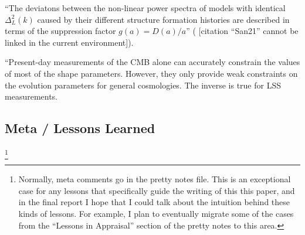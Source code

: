 \documentclass[11pt]{article}
\newcommand{\cbib}[1]
{\IfFileExists{biblatex.sty}
{\cite{#1}}
{[citation ``#1'' cannot be linked in the current environment]}}
\begin{document}
``The deviatons between the non-linear power spectra of models with identical
$\Delta_L^2 (k)$ caused by their different structure formation histories are
described in terms of the suppression factor $g(a) = D(a) / a$''
(\cbib{San21}).

``Present-day measurements of the CMB alone can accurately constrain the values
of most of the shape parameters. However, they only provide weak constraints on
the evolution parameters for general cosmologies. The inverse is true for LSS
measurements.

\begin{centering}
\section{Meta / Lessons Learned}
\end{centering}

\footnote{Normally, meta comments go in the pretty notes file. This is an
exceptional case for any lessons that specifically guide the writing of this
this paper, and in the final report I hope that I could talk about the
intuition behind these kinds of lessons. For example, I plan to eventually
migrate some of the cases from the ``Lessons in Appraisal'' section of the
pretty notes to this area.
}

 {
    \printbibliography
}
\end{document}
